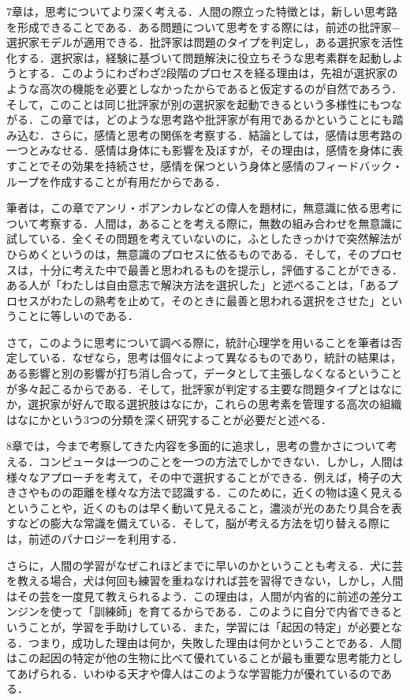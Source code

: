 \documentclass{jarticle}
\begin{document}
7章は，思考についてより深く考える．人間の際立った特徴とは，新しい思考路を形成できることである．ある問題について思考をする際には，前述の批評家$-$選択家モデルが適用できる．批評家は問題のタイプを判定し，ある選択家を活性化する．選択家は，経験に基づいて問題解決に役立ちそうな思考素群を起動しようとする．このようにわざわざ2段階のプロセスを経る理由は，先祖が選択家のような高次の機能を必要としなかったからであると仮定するのが自然であろう．そして，このことは同じ批評家が別の選択家を起動できるという多様性にもつながる．この章では，どのような思考路や批評家が有用であるかということにも踏み込む．さらに，感情と思考の関係を考察する．結論としては，感情は思考路の一つとみなせる．感情は身体にも影響を及ぼすが，その理由は，感情を身体に表すことでその効果を持続させ，感情を保つという身体と感情のフィードバック・ループを作成することが有用だからである．

筆者は，この章でアンリ・ポアンカレなどの偉人を題材に，無意識に依る思考について考察する．人間は，あることを考える際に，無数の組み合わせを無意識に試している．全くその問題を考えていないのに，ふとしたきっかけで突然解法がひらめくというのは，無意識のプロセスに依るものである．そして，そのプロセスは，十分に考えた中で最善と思われるものを提示し，評価することができる．ある人が「わたしは自由意志で解決方法を選択した」と述べることは，「あるプロセスがわたしの熟考を止めて，そのときに最善と思われる選択をさせた」ということに等しいのである．

さて，このように思考について調べる際に，統計心理学を用いることを筆者は否定している．なぜなら，思考は個々によって異なるものであり，統計の結果は，ある影響と別の影響が打ち消し合って，データとして主張しなくなるということが多々起こるからである．そして，批評家が判定する主要な問題タイプとはなにか，選択家が好んで取る選択肢はなにか，これらの思考素を管理する高次の組織はなにかという3つの分類を深く研究することが必要だと述べる．





8章では，今まで考察してきた内容を多面的に追求し，思考の豊かさについて考える．コンピュータは一つのことを一つの方法でしかできない．しかし，人間は様々なアプローチを考えて，その中で選択することができる．例えば，椅子の大きさやものの距離を様々な方法で認識する．このために，近くの物は遠く見えるということや，近くのものは早く動いて見えること，濃淡が光のあたり具合を表すなどの膨大な常識を備えている．そして，脳が考える方法を切り替える際には，前述のパナロジーを利用する．

さらに，人間の学習がなぜこれほどまでに早いのかということも考える．犬に芸を教える場合，犬は何回も練習を重ねなければ芸を習得できない，しかし，人間はその芸を一度見て教えられるよう．この理由は，人間が内省的に前述の差分エンジンを使って「訓練師」を育てるからである．このように自分で内省できるということが，学習を手助けしている．また，学習には「起因の特定」が必要となる．つまり，成功した理由は何か，失敗した理由は何かということである．人間はこの起因の特定が他の生物に比べて優れていることが最も重要な思考能力としてあげられる．いわゆる天才や偉人はこのような学習能力が優れているのである．
\end{document}
